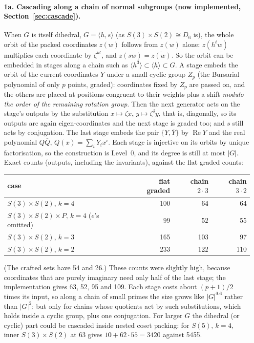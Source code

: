 \documentclass[11pt]{article}
\theoremstyle{definition}
\theoremstyle{remark}
\begin{document}
\paragraph{1a. Cascading along a chain of normal subgroups (now implemented, Section~\ref{sec:cascade}).}
When $G$ is itself dihedral, $G = \langle h, s\rangle$ (as $S(3)\times S(2)
\cong D_6$ is), the whole orbit of the packed coordinates $z(w)$ follows from
$z(w)$ alone: $z(h^t w)$ multiplies each coordinate by $\zeta^{kt}$, and
$z(s w) = \overline{z(w)}$. So the orbit can be embedded in stages along a chain
such as $\langle h^3\rangle \subset \langle h\rangle \subset G$. A stage embeds
the orbit of the current coordinates $Y$ under a small cyclic group $Z_p$ (the
Bursarial polynomial of only $p$ points, graded): coordinates fixed by $Z_p$
are passed on, and the others are placed at positions congruent to their
weights plus a shift \emph{modulo the order of the remaining rotation group}.
Then the next generator acts on the stage's outputs by the substitution
$x \mapsto \zeta x$, $y \mapsto \zeta^\delta y$, that is, diagonally, so its
outputs are again eigen-coordinates and the next stage is graded too; and $s$
still acts by conjugation. The last stage embeds the pair
$\{Y, \overline{Y}\}$ by $\operatorname{Re} Y$ and the real polynomial
$Q\overline{Q}$, $Q(x) = \sum_i Y_i x^i$. Each stage is injective on its orbits
by unique factorisation, so the construction is Level~0, and its degree is
still at most $|G|$. Exact counts (outputs, including the invariants), against
the flat graded counts:
\begin{center}
\begin{tabular}{lrrr}
  case & flat graded & chain $2\cdot3$ & chain $3\cdot2$ \\ \hline
  $S(3)\times S(2)$, $k = 4$                 & 100 & 64  & 64 \\
  $S(3)\times S(2)\times P$, $k = 4$ ($e$'s omitted) & 99 & 52 & 55 \\
  $S(3)\times S(2)$, $k = 3$                 & 165 & 103 & 97 \\
  $S(3)\times S(2)$, $k = 2$                 & 233 & 122 & 110
\end{tabular}
\end{center}
(The crafted sets have 54 and 26.) These counts were slightly high, because
coordinates that are purely imaginary need only half of the last stage; the
implementation gives 63, 52, 95 and 109. Each stage costs about $(p+1)/2$ times its input, so along a chain of
small primes the size grows like $|G|^{0.6}$ rather than $|G|^2$; but only for
chains whose quotients act by such substitutions, which holds inside a cyclic
group, plus one conjugation. For larger $G$ the dihedral (or cyclic) part
could be cascaded inside nested coset packing: for $S(5)$, $k = 4$, inner
$S(3)\times S(2)$ at 63 gives $10 + 62\cdot 55 = 3420$ against 5455.
\end{document}
